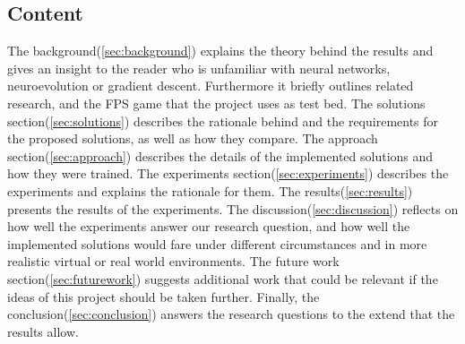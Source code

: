 \subsection{Content}
The background(\ref{sec:background}) explains the theory behind the results and gives an insight to the reader who is unfamiliar with neural networks, neuroevolution or gradient descent. Furthermore it briefly outlines related research, and the FPS game that the project uses as test bed. The solutions section(\ref{sec:solutions}) describes the rationale behind and the requirements for the proposed solutions, as well as how they compare. The approach section(\ref{sec:approach}) describes the details of the implemented solutions and how they were trained. The experiments section(\ref{sec:experiments}) describes the experiments and explains the rationale for them. The results(\ref{sec:results}) presents the results of the experiments. The discussion(\ref{sec:discussion}) reflects on how well the experiments answer our research question, and how well the implemented solutions would fare under different circumstances and in more realistic virtual or real world environments. The future work section(\ref{sec:futurework}) suggests additional work that could be relevant if the ideas of this project should be taken further. Finally, the conclusion(\ref{sec:conclusion}) answers the research questions to the extend that the results allow.


























